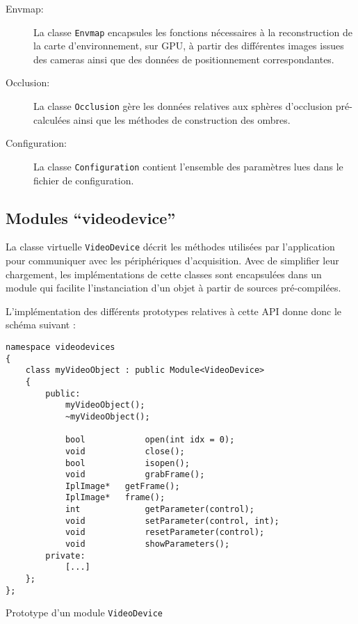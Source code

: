 \documentclass[10pt,a4paper,twoside, twocolumn]{report}
\begin{document}
\begin{description}
	\item[Envmap:] La classe \texttt{Envmap} encapsules les fonctions nécessaires à la reconstruction de la carte d’environnement, sur GPU, à partir des différentes images issues des cameras ainsi que des données de positionnement correspondantes.

	\item[Occlusion:] La classe \texttt{Occlusion} gère les données relatives aux sphères d’occlusion pré-calculées ainsi que les méthodes de construction des ombres.

	\item[Configuration:] La classe \texttt{Configuration} contient l’ensemble des paramètres lues dans le fichier de configuration.
\end{description}



\subsection{Modules “videodevice”}

La classe virtuelle \texttt{VideoDevice} décrit les méthodes utilisées par l’application pour communiquer avec les périphériques d’acquisition. Avec de simplifier leur chargement, les implémentations de cette classes sont encapsulées dans un module qui facilite l’instanciation d’un objet à partir de sources pré-compilées.

L’implémentation des différents prototypes relatives à cette API donne donc le schéma suivant :

\begin{code}[ht!]\centering
	\begin{lstlisting}
namespace videodevices
{
	class myVideoObject : public Module<VideoDevice>
	{		
		public:
			myVideoObject();
			~myVideoObject();

			bool			open(int idx = 0);
			void			close();
			bool			isopen();
			void			grabFrame();
			IplImage*	getFrame();
			IplImage*	frame();
			int 			getParameter(control);
			void			setParameter(control, int);
			void			resetParameter(control);
			void			showParameters();
		private:
			[...]
	};
};
	\end{lstlisting}
	\caption{Prototype d’un module \texttt{VideoDevice}}
\end{code}
\end{document}
